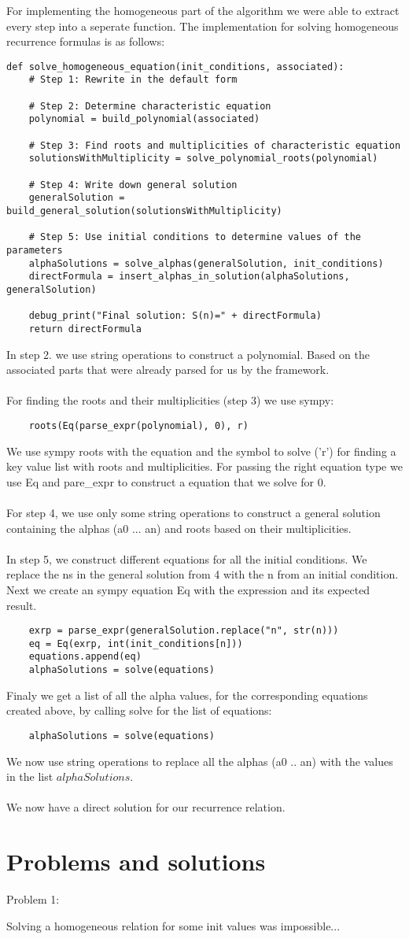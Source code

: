 \documentclass{article}
\begin{document}
For implementing the homogeneous part of the algorithm we were able to extract every step into a seperate function. The implementation for solving homogeneous recurrence formulas is as follows:
\begin{verbatim}
def solve_homogeneous_equation(init_conditions, associated):
    # Step 1: Rewrite in the default form

    # Step 2: Determine characteristic equation
    polynomial = build_polynomial(associated)

    # Step 3: Find roots and multiplicities of characteristic equation
    solutionsWithMultiplicity = solve_polynomial_roots(polynomial)

    # Step 4: Write down general solution
    generalSolution = build_general_solution(solutionsWithMultiplicity)

    # Step 5: Use initial conditions to determine values of the parameters
    alphaSolutions = solve_alphas(generalSolution, init_conditions)
    directFormula = insert_alphas_in_solution(alphaSolutions, generalSolution)

    debug_print("Final solution: S(n)=" + directFormula)
    return directFormula
\end{verbatim}
In step 2. we use string operations to construct a polynomial. Based on the associated parts that were already parsed for us by the framework.\\
\\
For finding the roots and their multiplicities (step 3) we use sympy:
\begin{verbatim}
    roots(Eq(parse_expr(polynomial), 0), r)
\end{verbatim}
We use sympy roots with the equation and the symbol to solve ('r') for finding a key value list with roots and multiplicities. For passing the right equation type we use Eq and pare\_expr to construct a equation that we solve for 0.\\
\\
For step 4, we use only some string operations to construct a general solution containing the alphas (a0 ... an) and roots based on their multiplicities.\\
\\
In step 5, we construct different equations for all the initial conditions. We replace the ns in the general solution from 4 with the n from an initial condition. Next we create an sympy equation Eq with the expression and its expected result.  
\begin{verbatim}
    exrp = parse_expr(generalSolution.replace("n", str(n)))
    eq = Eq(exrp, int(init_conditions[n]))
    equations.append(eq)
    alphaSolutions = solve(equations)
\end{verbatim}
Finaly we get a list of all the alpha values, for the corresponding equations created above, by calling solve for the list of equations:
\begin{verbatim}
    alphaSolutions = solve(equations)
\end{verbatim}
We now use string operations to replace all the alphas (a0 .. an) with the values in the list $alphaSolutions$.\\
\\
We now have a direct solution for our recurrence relation.


\section{Problems and solutions}
Problem 1:

Solving a homogeneous relation for some init values was impossible...
\end{document}

